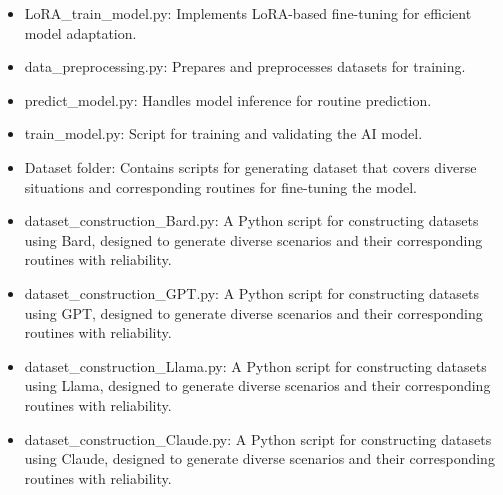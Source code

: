 \documentclass[conference]{IEEEtran}
\begin{document}
\begin{enumerate}[label=\arabic*]
\begin{itemize}[label=-]
        \item LoRA\_train\_model.py: Implements LoRA-based fine-tuning for efficient model adaptation.
        \vspace{0.7em}

        \item data\_preprocessing.py: Prepares and preprocesses datasets for training.
        \vspace{0.7em}

        \item predict\_model.py: Handles model inference for routine prediction.
        \vspace{0.7em}

        \item train\_model.py: Script for training and validating the AI model.
        \vspace{0.7em}

        \item Dataset folder: Contains scripts for generating dataset that covers diverse situations and corresponding routines for fine-tuning the model.
        \vspace{0.7em}

        \item dataset\_construction\_Bard.py: A Python script for constructing datasets using Bard, designed to generate diverse scenarios and their corresponding routines with reliability.
        \vspace{0.7em}

        \item dataset\_construction\_GPT.py: A Python script for constructing datasets using GPT, designed to generate diverse scenarios and their corresponding routines with reliability.
        \vspace{0.7em}

        \item dataset\_construction\_Llama.py: A Python script for constructing datasets using Llama, designed to generate diverse scenarios and their corresponding routines with reliability.
        \vspace{0.7em}

        \item dataset\_construction\_Claude.py: A Python script for constructing datasets using Claude, designed to generate diverse scenarios and their corresponding routines with reliability.
        \vspace{0.7em}        
    \end{itemize}
\end{enumerate}
\end{document}
